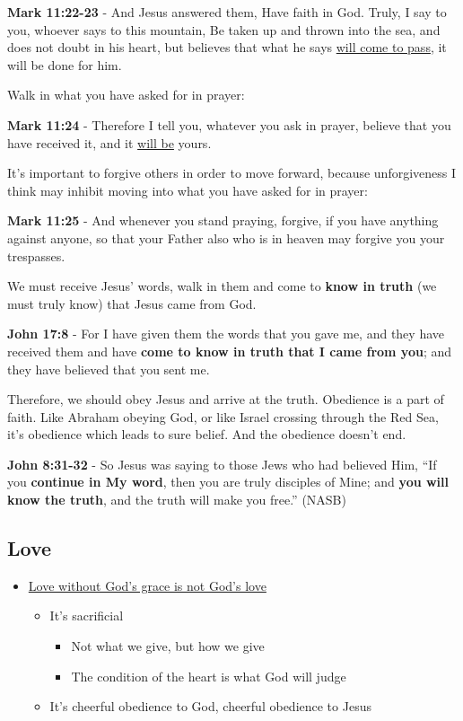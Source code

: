 \documentclass[11pt]{article}
\begin{document}
\textbf{Mark 11:22-23} - And Jesus answered them, Have faith in God. Truly, I say to you, whoever says to this mountain, Be taken up and thrown into the sea, and does not doubt in his heart, but believes that what he says \uline{will come to pass}, it will be done for him.

Walk in what you have asked for in prayer:

\textbf{Mark 11:24} - Therefore I tell you, whatever you ask in prayer, believe that you have received it, and it \uline{will be} yours.

It's important to forgive others in order to move forward, because unforgiveness I think may inhibit moving into what you have asked for in prayer:

\textbf{Mark 11:25} - And whenever you stand praying, forgive, if you have anything against anyone, so that your Father also who is in heaven may forgive you your trespasses.

We must receive Jesus' words, walk in them and come to \textbf{know in truth} (we must truly know) that Jesus came from God.

\textbf{John 17:8} - For I have given them the words that you gave me, and they have received them and have \textbf{come to know in truth that I came from you}; and they have believed that you sent me.

Therefore, we should obey Jesus and arrive at the truth. Obedience is a part of faith. Like Abraham obeying God, or like Israel crossing through the Red Sea, it's obedience which leads to sure belief.
And the obedience doesn't end.

\textbf{John 8:31-32} - So Jesus was saying to those Jews who had believed Him, “If you \textbf{continue in My word}, then you are truly disciples of Mine; and \textbf{you will know the truth}, and the truth will make you free.” (NASB)

\subsection{Love}
\label{sec:org04a1bf7}
\begin{itemize}
\item \href{https://www.youtube.com/watch?v=d2FKSxaa76w\&ab\_channel=FatherSpyridon}{Love without God's grace is not God's love}
\begin{itemize}
\item It's sacrificial
\begin{itemize}
\item Not what we give, but how we give
\item The condition of the heart is what God will judge
\end{itemize}
\item It's cheerful obedience to God, cheerful obedience to Jesus
\end{itemize}
\end{itemize}
\end{document}
